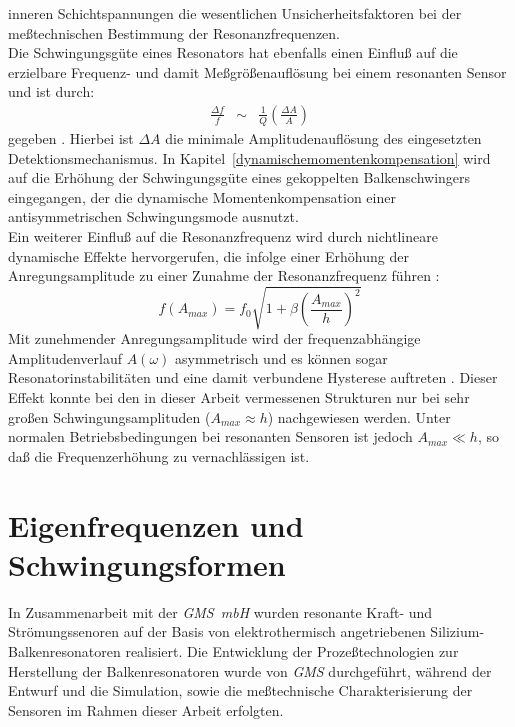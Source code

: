 inneren Schichtspannungen die wesentlichen Unsicherheitsfaktoren bei der
meßtechnischen Bestimmung der Resonanzfrequenzen.\\
Die Schwingungsgüte eines Resonators hat ebenfalls einen Einfluß auf die
erzielbare Frequenz- und damit Meßgrößenauflösung bei einem resonanten
Sensor und ist durch:
\begin{eqnarray}
\label{Qaufl}
 \frac{\Delta f}{f} & \sim & \frac{1}{Q} \left( \frac{\Delta A}{A} \right)
\end{eqnarray}
gegeben \cite{Til93}. Hierbei ist $\Delta A$ die minimale
Amplitudenauflösung des eingesetzten Detektionsmechanismus.
In Kapitel~\ref{dynamischemomentenkompensation} wird auf die Erhöhung der
Schwingungsgüte eines gekoppelten Balkenschwingers eingegangen, der die
dynamische Momentenkompensation einer antisymmetrischen Schwingungsmode
ausnutzt.\\
Ein weiterer Einfluß auf die Resonanzfrequenz wird durch nichtlineare
dynamische Effekte hervorgerufen, die infolge einer Erhöhung der
Anregungsamplitude zu einer Zunahme der Resonanzfrequenz führen \cite{Eis64}:
\begin{equation}
\label{nlampli}
 f(A_{max}) = f_{0} \sqrt{1 + \beta \left( \frac{A_{max}}{h} \right)^2 }
\end{equation}
Mit zunehmender Anregungsamplitude wird der frequenzabhängige
Amplitudenverlauf $A(\omega)$ asymmetrisch und es können sogar
Resonatorinstabilitäten und eine damit verbundene Hysterese auftreten
\cite{And87, Zoo92}. Dieser Effekt konnte bei den in dieser Arbeit
vermessenen Strukturen nur bei sehr großen Schwingungsamplituden
($A_{max} \approx h$) nachgewiesen werden. Unter normalen
Betriebsbedingungen bei resonanten Sensoren ist jedoch $A_{max} \ll h$,
so daß die Frequenzerhöhung zu vernachlässigen ist.


\newpage
\section{Eigenfrequenzen und Schwingungsformen}
\label{eigenfrequenzenundschwingungsformen}

In Zusammenarbeit mit der {\em GMS~mbH} wurden resonante Kraft- und
Strömungssenoren auf der Basis von elektrothermisch angetriebenen
Silizium-Balkenresonatoren realisiert. Die Entwicklung der Prozeßtechnologien
zur Herstellung der Balkenresonatoren wurde von {\em GMS} durchgeführt,
während der Entwurf und die Simulation, sowie die meßtechnische
Charakterisierung der Sensoren im Rahmen dieser Arbeit erfolgten.


